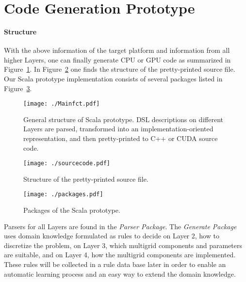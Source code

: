 \documentclass[onecolumn]{svjour3}
\begin{document}
\section{Code Generation Prototype \label{sec:scala}}

\paragraph{Structure}

With the above information of the target platform and information from all higher Layers, one can finally generate CPU or GPU code as summarized in Figure~\ref{fig:scalastructure}. 
In Figure~\ref{pix:scalasource} one finds the structure of the pretty-printed source file.
Our Scala prototype implementation consists of several packages listed in Figure~\ref{fig:scalapackages}.

\begin{figure}[ht!]
\begin{center}
\texttt{[image: ./Mainfct.pdf]}
\caption[Partitioning of a cell-centered grid into four sub-grids]{General structure of Scala prototype. DSL descriptions on different Layers are parsed, transformed into
an implementation-oriented representation, and then pretty-printed to C++ or CUDA source code.}
\label{fig:scalastructure}
\end{center}
\end{figure}

\begin{figure}[ht!]
\begin{center}
\texttt{[image: ./sourcecode.pdf]}
\caption[Partitioning of a cell-centered grid into four sub-grids]{Structure of the pretty-printed source file.}
\label{pix:scalasource}
\end{center}
\end{figure}

\begin{figure}[ht!]
\begin{center}
\texttt{[image: ./packages.pdf]}
\caption[Partitioning of a cell-centered grid into four sub-grids]{Packages of the Scala prototype.}
\label{fig:scalapackages}
\end{center}
\end{figure}


Parsers for all Layers are found in the \textit{Parser Package}.
The \textit{Generate Package} uses domain knowledge formulated as rules to decide on Layer 2, how to discretize the problem, on Layer 3, which multigrid components and parameters are suitable, and on Layer 4, how the multigrid components are implemented. These rules will be collected in a rule data base later in order to enable an automatic learning process and an easy way to extend the domain knowledge.
\end{document}
